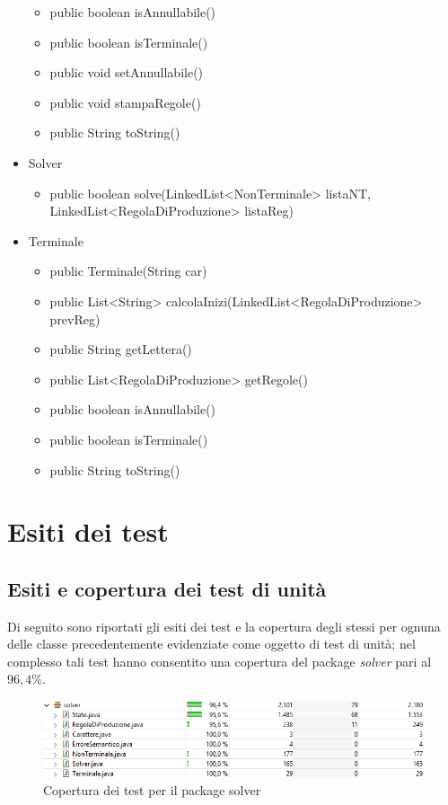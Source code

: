 \documentclass[12pt]{article}
\begin{document}
\begin{itemize}
\begin{itemize}
\item public boolean isAnnullabile()
\item public boolean isTerminale()
\item public void setAnnullabile()
\item public void stampaRegole()
\item public String toString()
\end{itemize}
\item Solver
\begin{itemize}
\item public boolean solve(LinkedList<NonTerminale> listaNT, \\
\hspace*{104pt} LinkedList<RegolaDiProduzione> listaReg)
\end{itemize}
\item Terminale
\begin{itemize}
\item public Terminale(String car)
\item public List<String> calcolaInizi(LinkedList<RegolaDiProduzione> prevReg)
\item public String getLettera()
\item public List<RegolaDiProduzione> getRegole()
\item public boolean isAnnullabile()
\item public boolean isTerminale()
\item public String toString()
\end{itemize}
\end{itemize}
\pagebreak
\section{Esiti dei test}
\subsection{Esiti e copertura dei test di unità}
Di seguito sono riportati gli esiti dei test e la copertura degli stessi per ognuna delle classe precedentemente evidenziate come oggetto di test di unità; nel complesso tali test hanno consentito una copertura del package \textit{solver} pari al $96,4\%$.
\begin{figure}[h]
\centering
\includegraphics[width=\textwidth]{immagini/SolverCoverage.png}
\caption{Copertura dei test per il package solver}
\end{figure}
\end{document}
